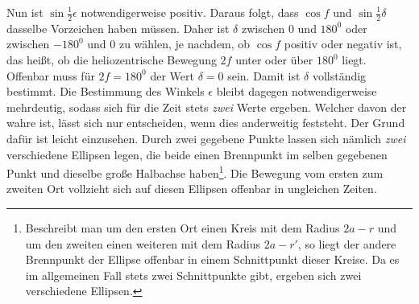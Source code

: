 \noindent Nun ist $\sin\tfrac12\epsilon$ notwendigerweise positiv. Daraus folgt, dass $\cos f$ und $\sin\tfrac12\delta$ dasselbe Vorzeichen haben müssen. Daher ist $\delta$ zwischen 0 und $180^0$ oder zwischen $-180^0$ und 0 zu wählen, je nachdem, ob $\cos f$ positiv oder negativ ist, das heißt, ob die heliozentrische Bewegung $2f$ unter oder über $180^0$ liegt. Offenbar muss für $2f=180^0$ der Wert $\delta=0$ sein. Damit ist $\delta$ vollständig bestimmt. Die Bestimmung des Winkels $\epsilon$ bleibt dagegen notwendigerweise mehrdeutig, sodass sich für die Zeit stets \textit{zwei} Werte ergeben. Welcher davon der wahre ist, lässt sich nur entscheiden, wenn dies anderweitig feststeht. Der Grund dafür ist leicht einzusehen. Durch zwei gegebene Punkte lassen sich nämlich \textit{zwei} verschiedene Ellipsen legen, die beide einen Brennpunkt im selben gegebenen Punkt und dieselbe große Halbachse haben\footnote{Beschreibt man um den ersten Ort einen Kreis mit dem Radius $2a-r$ und um den zweiten einen weiteren mit dem Radius $2a-r'$, so liegt der andere Brennpunkt der Ellipse offenbar in einem Schnittpunkt dieser Kreise. Da es im allgemeinen Fall stets zwei Schnittpunkte gibt, ergeben sich zwei verschiedene Ellipsen.}. Die Bewegung vom ersten zum zweiten Ort vollzieht sich auf diesen Ellipsen offenbar in ungleichen Zeiten.
